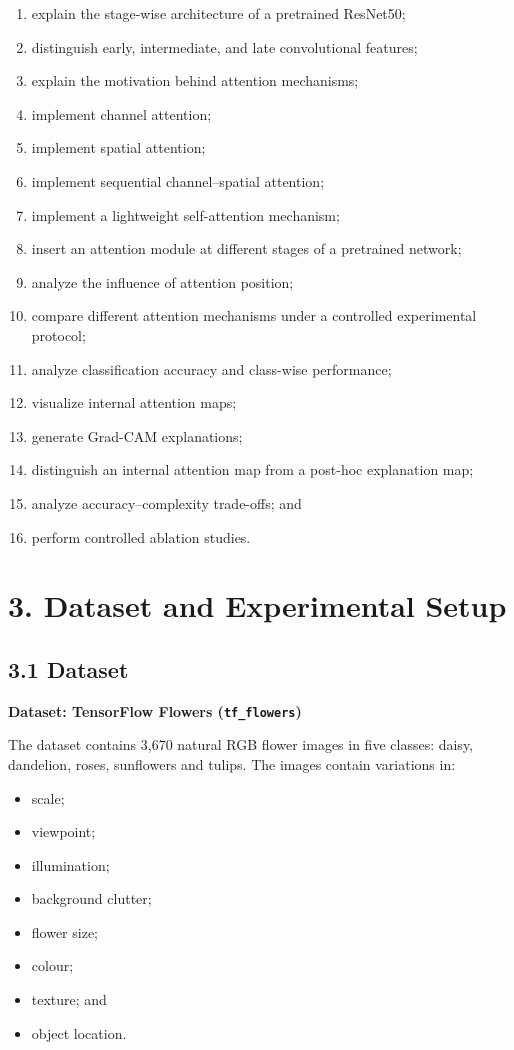 \documentclass[11pt]{article}
\begin{document}
\begin{enumerate}
\item explain the stage-wise architecture of a pretrained ResNet50;
\item distinguish early, intermediate, and late convolutional features;
\item explain the motivation behind attention mechanisms;
\item implement channel attention;
\item implement spatial attention;
\item implement sequential channel--spatial attention;
\item implement a lightweight self-attention mechanism;
\item insert an attention module at different stages of a pretrained network;
\item analyze the influence of attention position;
\item compare different attention mechanisms under a controlled experimental protocol;
\item analyze classification accuracy and class-wise performance;
\item visualize internal attention maps;
\item generate Grad-CAM explanations;
\item distinguish an internal attention map from a post-hoc explanation map;
\item analyze accuracy--complexity trade-offs; and
\item perform controlled ablation studies.
\end{enumerate}

\section*{3. Dataset and Experimental Setup}

\subsection*{3.1 Dataset}

\textbf{Dataset: TensorFlow Flowers (\texttt{tf\_flowers})}

The dataset contains 3{,}670 natural RGB flower images in five classes:
daisy, dandelion, roses, sunflowers and tulips. The images contain
variations in:

\begin{itemize}
\item scale;
\item viewpoint;
\item illumination;
\item background clutter;
\item flower size;
\item colour;
\item texture; and
\item object location.
\end{itemize}
\end{document}
